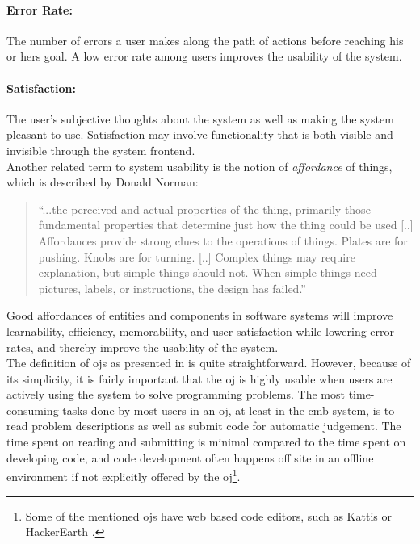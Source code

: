 \paragraph*{Error Rate:} The number of errors a user makes along the path of actions before reaching his or hers goal. A low error rate among users improves the usability of the system.

\paragraph*{Satisfaction:} The user's subjective thoughts about the system as well as making the system pleasant to use. Satisfaction may involve functionality that is both visible and invisible through the system frontend.\\

Another related term to system usability is the notion of \textit{affordance} of things, which is described by Donald Norman:
\blockquote{``...the perceived and actual properties of the thing, primarily those fundamental properties that determine just how the thing could be used [..] Affordances provide strong clues to the operations of things. Plates are for pushing. Knobs are for turning. [..] Complex things may require explanation, but simple things should not. When simple things need pictures, labels, or instructions, the design has failed.''  \cite{norman1988design}}

Good affordances of entities and components in software systems will improve learnability, efficiency, memorability, and user satisfaction while lowering error rates, and thereby improve the usability of the system. \\

The definition of \glspl{oj} as presented in  is quite straightforward. However, because of its simplicity, it is fairly important that the \gls{oj} is highly usable when users are actively using the system to solve programming problems. The most time-consuming tasks done by most users in an \gls{oj}, at least in the \gls{cmb} system, is to read problem descriptions as well as submit code for automatic judgement. The time spent on reading and submitting is minimal compared to the time spent on developing code, and code development often happens off site in an offline environment if not explicitly offered by the \gls{oj}\footnote{Some of the mentioned \glspl{oj} have web based code editors, such as Kattis \cite{KATTIS} or HackerEarth \cite{HACKEREARTH}.}. \\

